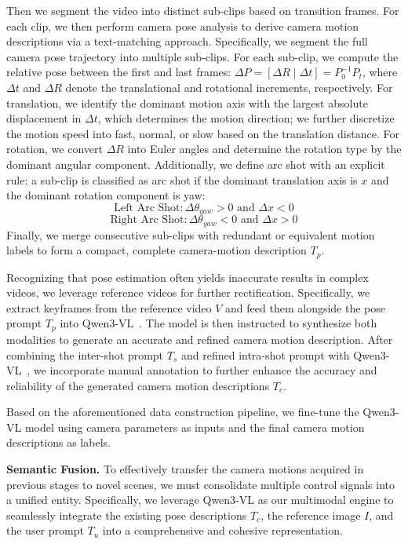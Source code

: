 \documentclass{llmxive}
\begin{document}
Then we segment the video into distinct sub-clips based on transition frames. For each clip, we then perform camera pose analysis to derive camera motion descriptions via a text-matching approach. Specifically, we segment the full camera pose trajectory into multiple sub-clips. For each sub-clip, we compute the relative pose between the first and last frames: $\Delta P = [\Delta R \mid \Delta t] = P_0^{-1}P_t$, where $\Delta t$ and $\Delta R$ denote the translational and rotational increments, respectively. For translation, we identify the dominant motion axis with the largest absolute displacement in $\Delta t$, which determines the motion direction; we further discretize the motion speed into fast, normal, or slow based on the translation distance. For rotation, we convert $\Delta R$ into Euler angles and determine the rotation type by the dominant angular component.
Additionally, we define arc shot with an explicit rule: a sub-clip is classified as arc shot if the dominant translation axis is $x$ and the dominant rotation component is yaw:
\begin{equation}
    \text{Left Arc Shot}: \Delta \theta_{yaw} > 0 \text{ and } \Delta x < 0
\end{equation}
\begin{equation}
    \text{Right Arc Shot}: \Delta \theta_{yaw} < 0 \text{ and }  \Delta x > 0 
\end{equation}
Finally, we merge consecutive sub-clips with redundant or equivalent motion labels to form a compact, complete camera-motion description $T_p$. 

Recognizing that pose estimation often yields inaccurate results in complex videos, we leverage reference videos for further rectification. Specifically, we extract keyframes from the reference video $V$ and feed them alongside the pose prompt $T_p$ into Qwen3-VL~\cite{bai2025qwen3}. The model is then instructed to synthesize both modalities to generate an accurate and refined camera motion description. After combining the inter-shot prompt $T_s$ and refined intra-shot prompt with Qwen3-VL~\cite{bai2025qwen3}, we incorporate manual annotation to further enhance the accuracy and reliability of the generated camera motion descriptions $T_c$.

Based on the aforementioned data construction pipeline, we fine-tune the Qwen3-VL model using camera parameters as inputs and the final camera motion descriptions as labels.


\textbf{Semantic Fusion.} To effectively transfer the camera motions acquired in previous stages to novel scenes, we must consolidate multiple control signals into a unified entity. Specifically, we leverage Qwen3-VL as our multimodal engine to seamlessly integrate the existing pose descriptions $T_c$, the reference image $I$, and the user prompt $T_u$ into a comprehensive and cohesive representation.
\end{document}
